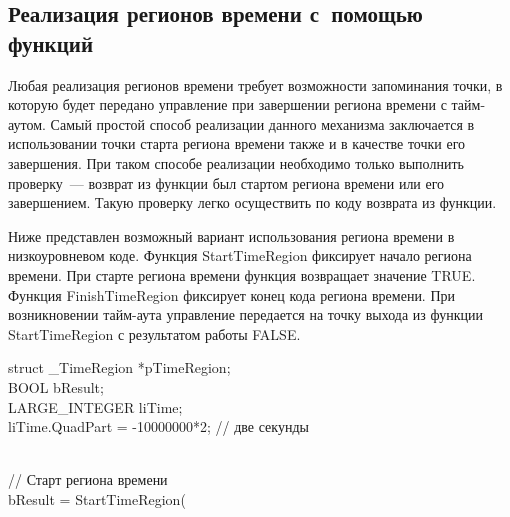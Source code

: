 \begin{multicols}{2}
\section{Реализация регионов времени с~помощью функций}

   Любая реализация регионов времени требует возможности запоминания точки, в которую
будет передано управление при завершении региона времени с тайм-аутом. Самый простой способ
реализации данного механизма заключается в использовании точки старта региона времени также
и в качестве точки его завершения. При таком способе реализации необходимо только выполнить
проверку~--- возврат из функции был стартом региона времени или его завершением. Такую
проверку легко осуществить по коду возврата из функции.

   Ниже представлен возможный вариант использования региона времени в низкоуровневом коде.
Функция StartTimeRegion фиксирует начало региона времени. При старте региона времени
функция возвращает значение TRUE. Функция FinishTimeRegion фиксирует конец кода региона
времени. При возникновении тайм-аута управление передается на точку выхода из функции
StartTimeRegion с результатом работы FALSE.

\medskip
\noindent
{\small
{\sf struct \_TimeRegion *pTimeRegion;}\\
{\sf BOOL bResult;}\\
{\sf LARGE\_INTEGER liTime;}\\
{\sf liTime.QuadPart = -10000000*2; // две секунды}\\
\


\noindent
{\sf// Старт региона времени}\\
{\sf bResult = StartTimeRegion( }\\
\hspace*{5mm}{\sf    SYSTEM\_TIME, // Системное время}\\
\hspace*{5mm}{\sf    liTime,}\\
\hspace*{5mm}{\sf    \&pTimeRegion);}\\
\

}
\end{multicols}
